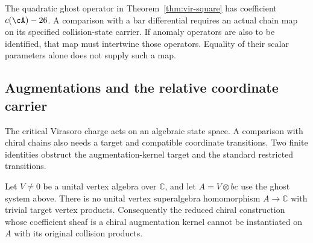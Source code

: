 \begin{remark}
\label{rem:brst-nilpotence-periodicity}
The quadratic ghost operator in Theorem~\ref{thm:vir-square} has coefficient $c(\cA)-26$.
A comparison with a bar differential requires an actual chain map on its specified collision-state carrier.
If anomaly operators are also to be identified, that map must intertwine those operators.
Equality of their scalar parameters alone does not supply such a map.
\end{remark}

\subsection{Augmentations and the relative coordinate carrier}

The critical Virasoro charge acts on an algebraic state space.
A comparison with chiral chains also needs a target and compatible coordinate transitions.
Two finite identities obstruct the augmentation-kernel target and the standard restricted transitions.

\begin{proposition}\label{prop:vir-no-augmentation}
Let $V\neq0$ be a unital vertex algebra over $\mathbb C$, and let $A=V\otimes bc$ use the ghost system above.
There is no unital vertex superalgebra homomorphism $A\to\mathbb C$ with trivial target vertex products.
Consequently the reduced chiral construction whose coefficient sheaf is a chiral augmentation kernel cannot be instantiated on $A$ with its original collision products.
\end{proposition}


